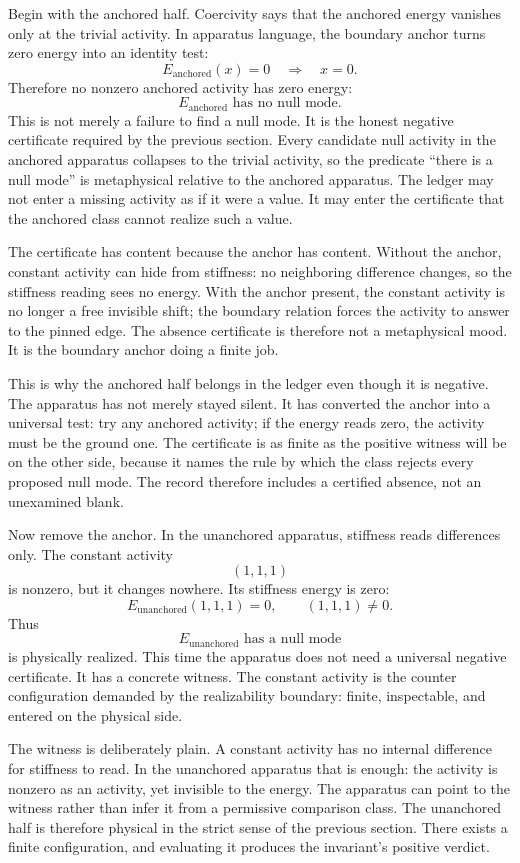 Begin with the anchored half. Coercivity says that the anchored energy vanishes
only at the trivial activity. In apparatus language, the boundary anchor turns
zero energy into an identity test:
\[
  E_{\mathrm{anchored}}(x) = 0
  \quad\Longrightarrow\quad
  x = 0.
\]
Therefore no nonzero anchored activity has zero energy:
\[
  E_{\mathrm{anchored}} \text{ has no null mode}.
\]
This is not merely a failure to find a null mode. It is the honest negative
certificate required by the previous section. Every candidate null activity in
the anchored apparatus collapses to the trivial activity, so the predicate
``there is a null mode'' is metaphysical relative to the anchored apparatus.
The ledger may not enter a missing activity as if it were a value. It may enter
the certificate that the anchored class cannot realize such a value.

The certificate has content because the anchor has content. Without the anchor,
constant activity can hide from stiffness: no neighboring difference changes,
so the stiffness reading sees no energy. With the anchor present, the constant
activity is no longer a free invisible shift; the boundary relation forces the
activity to answer to the pinned edge. The absence certificate is therefore not
a metaphysical mood. It is the boundary anchor doing a finite job.

This is why the anchored half belongs in the ledger even though it is negative.
The apparatus has not merely stayed silent. It has converted the anchor into a
universal test: try any anchored activity; if the energy reads zero, the
activity must be the ground one. The certificate is as finite as the positive
witness will be on the other side, because it names the rule by which the class
rejects every proposed null mode. The record therefore includes a certified
absence, not an unexamined blank.

Now remove the anchor. In the unanchored apparatus, stiffness reads differences
only. The constant activity
\[
  (1,1,1)
\]
is nonzero, but it changes nowhere. Its stiffness energy is zero:
\[
  E_{\mathrm{unanchored}}(1,1,1) = 0,
  \qquad
  (1,1,1) \neq 0.
\]
Thus
\[
  E_{\mathrm{unanchored}} \text{ has a null mode}
\]
is physically realized. This time the apparatus does not need a universal
negative certificate. It has a concrete witness. The constant activity is the counter
configuration demanded by the realizability boundary: finite, inspectable, and
entered on the physical side.

The witness is deliberately plain. A constant activity has no internal
difference for stiffness to read. In the unanchored apparatus that is enough:
the activity is nonzero as an activity, yet invisible to the energy. The
apparatus can point to the witness rather than infer it from a permissive
comparison class. The unanchored half is therefore physical in the strict sense
of the previous section. There exists a finite configuration, and evaluating it
produces the invariant's positive verdict.

